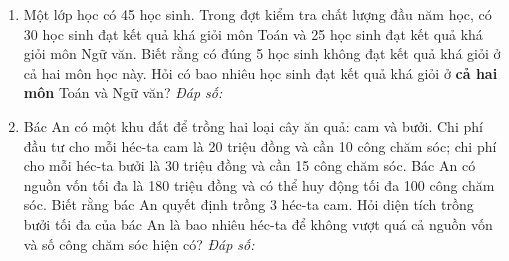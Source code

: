\documentclass[12pt,a4paper]{article}
\newcommand{\answerbox}{\hfill\textit{Đáp số:}\ \fbox{\rule{0pt}{10pt}\hspace{2.0cm}}}
\begin{document}
\begin{enumerate}[resume]
\begin{minipage}[t]{0.33\linewidth}
\end{minipage}

\item Một lớp học có 45 học sinh. Trong đợt kiểm tra chất lượng đầu năm học, có 30 học sinh đạt kết quả khá giỏi môn Toán và 25 học sinh đạt kết quả khá giỏi môn Ngữ văn. Biết rằng có đúng 5 học sinh không đạt kết quả khá giỏi ở cả hai môn học này. Hỏi có bao nhiêu học sinh đạt kết quả khá giỏi ở \textbf{cả hai môn} Toán và Ngữ văn?
\answerbox

\item Bác An có một khu đất để trồng hai loại cây ăn quả: cam và bưởi. Chi phí đầu tư cho mỗi héc-ta cam là 20 triệu đồng và cần 10 công chăm sóc; chi phí cho mỗi héc-ta bưởi là 30 triệu đồng và cần 15 công chăm sóc. Bác An có nguồn vốn tối đa là 180 triệu đồng và có thể huy động tối đa 100 công chăm sóc. Biết rằng bác An quyết định trồng $3$ héc-ta cam. Hỏi diện tích trồng bưởi tối đa của bác An là bao nhiêu héc-ta để không vượt quá cả nguồn vốn và số công chăm sóc hiện có?
\answerbox
\end{enumerate}
\end{document}

